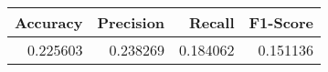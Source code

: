 \begin{tabular}{rrrr}
\toprule
 Accuracy &  Precision &   Recall &  F1-Score \\
\midrule
 0.225603 &   0.238269 & 0.184062 &  0.151136 \\
\bottomrule
\end{tabular}
